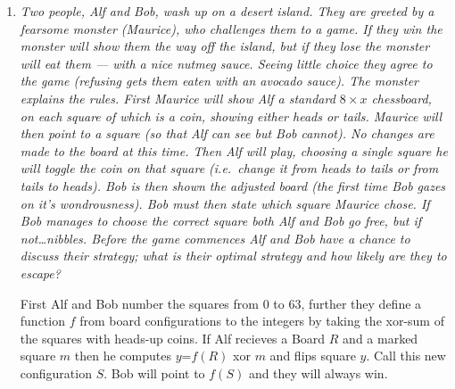 \documentclass{article}
\begin{document}
\begin{enumerate}[1.]
\vspace{6pt}
\item %
{\itshape Two people, Alf and Bob, wash up on a desert island. They are greeted by a fearsome monster (Maurice), who challenges them to a game. If they win the monster will show them the way off the island, but if they lose the monster will eat them --- with a nice nutmeg sauce. Seeing little choice they agree to the game (refusing gets them eaten with an avocado sauce). The monster explains the rules. First Maurice will show Alf a standard $8 \times x$ chessboard, on each square of which is a coin, showing either heads or tails. Maurice will then point to a square (so that Alf can see but Bob cannot). No changes are made to the board at this time. Then Alf will play, choosing a single square he will toggle the coin on that square (i.e.\ change it from heads to tails or from tails to heads). Bob is then shown the adjusted board (the first time Bob gazes on it's wondrousness). Bob must then state which square Maurice chose. If Bob manages to choose the correct square both Alf and Bob go free, but if not\dots nibbles. Before the game commences Alf and Bob have a chance to discuss their strategy; what is their optimal strategy and how likely are they to escape?}

First Alf and Bob number the squares from 0 to 63, further they define a function $f$ from board configurations to the integers by taking the xor-sum of the squares with heads-up coins. If Alf recieves a Board $R$ and a marked square $m$ then he computes $y$=$f(R)$ xor $m$ and flips square  $y$. Call this new configuration $S$. Bob will point to $f(S)$ and they will always win.  
\end{enumerate}
\end{document}
